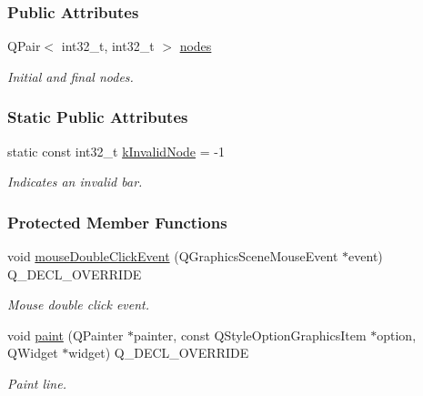 \subsubsection*{Public Attributes}
\begin{DoxyCompactItemize}
\item 
Q\+Pair$<$ int32\+\_\+t, int32\+\_\+t $>$ \hyperlink{class_line_afd17c40d656e6a8d677cb22df5f0c70b}{nodes}
\begin{DoxyCompactList}\small\item\em Initial and final nodes. \end{DoxyCompactList}\end{DoxyCompactItemize}
\subsubsection*{Static Public Attributes}
\begin{DoxyCompactItemize}
\item 
static const int32\+\_\+t \hyperlink{group___models_gadc334bd07c6126abc56e531d7e3e72b4}{k\+Invalid\+Node} = -\/1
\begin{DoxyCompactList}\small\item\em Indicates an invalid bar. \end{DoxyCompactList}\end{DoxyCompactItemize}
\subsubsection*{Protected Member Functions}
\begin{DoxyCompactItemize}
\item 
void \hyperlink{group___models_ga9a1fee5b1606ab0deedd04bdab99be70}{mouse\+Double\+Click\+Event} (Q\+Graphics\+Scene\+Mouse\+Event $\ast$event) Q\+\_\+\+D\+E\+C\+L\+\_\+\+O\+V\+E\+R\+R\+I\+D\+E
\begin{DoxyCompactList}\small\item\em Mouse double click event. \end{DoxyCompactList}\item 
void \hyperlink{group___models_ga0aa64aed379d434be5942edf572b444b}{paint} (Q\+Painter $\ast$painter, const Q\+Style\+Option\+Graphics\+Item $\ast$option, Q\+Widget $\ast$widget) Q\+\_\+\+D\+E\+C\+L\+\_\+\+O\+V\+E\+R\+R\+I\+D\+E
\begin{DoxyCompactList}\small\item\em Paint line. \end{DoxyCompactList}\end{DoxyCompactItemize}


